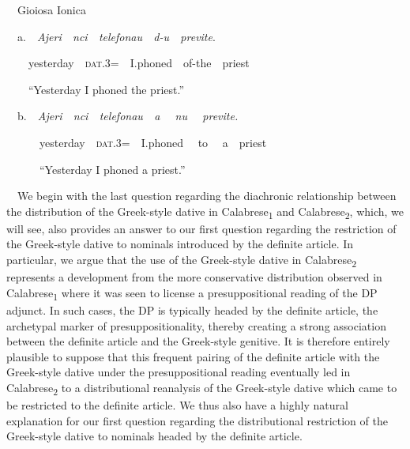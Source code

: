 \documentclass[output=paper,modfonts,nonflat]{langsci/langscibook}
\begin{document}
\begin{listWWNumviiileveli}
\item 
\begin{styleListParagraph}
\ \ Gioiosa Ionica
\end{styleListParagraph}
\end{listWWNumviiileveli}
\begin{styleListParagraph}
\ \ a.\ \ \textit{Ajeri\ \ nci\ \ telefonau\ \ d-u\ \ previte}.
\end{styleListParagraph}

\begin{styleStandard}
\ \ \ \ yesterday\ \ \textsc{dat}.3=\ \ I.phoned\ \ of-the\ \ priest
\end{styleStandard}

\begin{styleStandard}
\ \ \ \ “Yesterday I phoned the priest.”
\end{styleStandard}

\begin{styleStandard}
\ \ b.\ \ \textit{Ajeri\ \ nci\ \ telefonau\ \ a \ \ nu \ \ previte.}
\end{styleStandard}

\begin{styleStandard}
\ \ \ \ \ \ yesterday\ \ \textsc{dat}.3=\ \ I.phoned \ \ to \ \ a\ \ priest 
\end{styleStandard}

\begin{styleStandard}
\ \ \ \ \ \ “Yesterday I phoned a priest.”
\end{styleStandard}

\begin{styleStandard}
\ \ We begin with the last question regarding the diachronic relationship between the distribution of the Greek-style dative in Calabrese\textsubscript{1} and Calabrese\textsubscript{2}, which, we will see, also provides an answer to our first question regarding the restriction of the Greek-style dative to nominals introduced by the definite article. In particular, we argue that the use of the Greek-style dative in Calabrese\textsc{\textsubscript{2}} represents a development from the more conservative distribution observed in Calabrese\textsubscript{1} where it was seen to license a presuppositional reading of the DP adjunct. In such cases, the DP is typically headed by the definite article, the archetypal marker of presuppositionality, thereby creating a strong association between the definite article and the Greek-style genitive. It is therefore entirely plausible to suppose that this frequent pairing of the definite article with the Greek-style dative under the presuppositional reading eventually led in Calabrese\textsubscript{2} to a distributional reanalysis of the Greek-style dative which came to be restricted to the definite article. We thus also have a highly natural explanation for our first question regarding the distributional restriction of the Greek-style dative to nominals headed by the definite article. 
\end{styleStandard}
\end{document}
